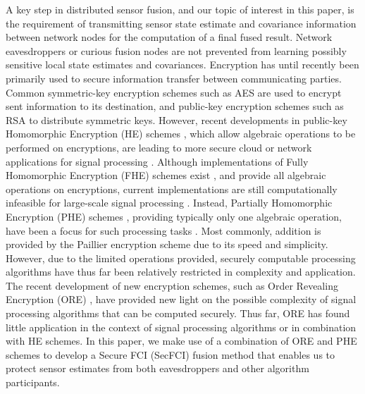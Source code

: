 \documentclass[letterpaper, 10 pt, conference]{ieeeconf}  %
\begin{document}
A key step in distributed sensor fusion, and our topic of interest in this paper, is the requirement of transmitting sensor state estimate and covariance information between network nodes for the computation of a final fused result. Network eavesdroppers or curious fusion nodes are not prevented from learning possibly sensitive local state estimates and covariances. Encryption has until recently been primarily used to secure information transfer between communicating parties. Common symmetric-key encryption schemes such as AES \cite{daemonAnnouncingAdvancedEncryption2001} are used to encrypt sent information to its destination, and public-key encryption schemes such as RSA \cite{rivestMethodObtainingDigital1978} to distribute symmetric keys. However, recent developments in public-key Homomorphic Encryption (HE) schemes \cite{gentryFullyHomomorphicEncryption2009,elgamalPublicKeyCryptosystem1985,paillierPublicKeyCryptosystemsBased1999}, which allow algebraic operations to be performed on encryptions, are leading to more secure cloud or network applications for signal processing \cite{lagendijkEncryptedSignalProcessing2012,alexandruEncryptedCooperativeControl2019,aristovEncryptedMultisensorInformation2018}. Although implementations of Fully Homomorphic Encryption (FHE) schemes exist \cite{gentryImplementingGentryFullyHomomorphic2011}, and provide all algebraic operations on encryptions, current implementations are still computationally infeasible for large-scale signal processing \cite{duImplementingMLAlgorithms2017,acarSurveyHomomorphicEncryption2018}. Instead, Partially Homomorphic Encryption (PHE) schemes \cite{elgamalPublicKeyCryptosystem1985,paillierPublicKeyCryptosystemsBased1999}, providing typically only one algebraic operation, have been a focus for such processing tasks \cite{alexandruEncryptedCooperativeControl2019,aristovEncryptedMultisensorInformation2018}. Most commonly, addition is provided by the Paillier encryption scheme \cite{paillierPublicKeyCryptosystemsBased1999} due to its speed and simplicity. However, due to the limited operations provided, securely computable processing algorithms have thus far been relatively restricted in complexity and application. The recent development of new encryption schemes, such as Order Revealing Encryption (ORE) \cite{chenettePracticalOrderRevealingEncryption2016,lewiOrderRevealingEncryptionNew2016,bogatovComparativeEvaluationOrderPreserving2018}, have provided new light on the possible complexity of signal processing algorithms that can be computed securely. Thus far, ORE has found little application in the context of signal processing algorithms or in combination with HE schemes. In this paper, we make use of a combination of ORE and PHE schemes to develop a Secure FCI (SecFCI) fusion method that enables us to protect sensor estimates from both eavesdroppers and other algorithm participants.
\end{document}
